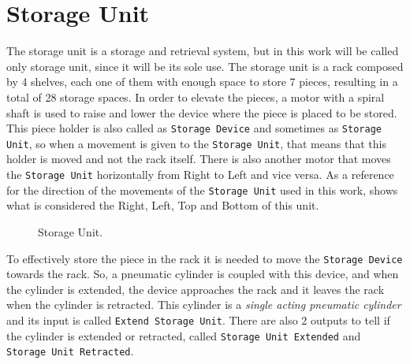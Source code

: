 \section{Storage Unit}
\label{sec:storageUnit}

The storage unit is a storage and retrieval system, but in this work
will be called only storage unit, since it will be its sole use.
The storage unit is a rack composed by 4 shelves, each one of them with enough space to
store 7 pieces, resulting in a total of 28 storage spaces. In order to elevate the
pieces, a motor with a spiral shaft is used to raise and lower the device where
the piece is placed to be stored. This piece holder is also called as
\verb|Storage Device| and sometimes as \verb|Storage Unit|, so when a movement
is given to the \verb|Storage Unit|, that means that this holder is moved and not the
rack itself.
There is also another motor that moves the
\verb|Storage Unit|
horizontally from Right to Left and vice versa.
As a reference for the direction of the movements of the
\verb|Storage Unit| used in this work, 
 shows what is considered the Right, Left, Top and
Bottom of this unit.

\begin{figure}[H]
  \centering
  \caption{Storage Unit.}
  \label{fig:storageUnit}
\end{figure}
To effectively store the piece in the rack it is needed to move the
\verb|Storage Device| towards the rack. So, a pneumatic cylinder is coupled with
this device, and when the cylinder is extended, the device approaches the rack and
it leaves the rack when the cylinder is retracted. This cylinder is a
\emph{single acting pneumatic cylinder} and its input is called
\verb|Extend Storage Unit|. There are also 2 outputs to tell if the cylinder is
extended or retracted, called \verb|Storage Unit Extended| and
\verb|Storage Unit Retracted|.

